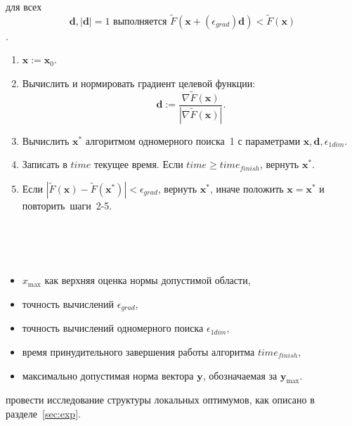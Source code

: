 для всех $$\textbf{d}, |\textbf{d}| = 1 \text{~выполняется~} \tilde{F}(\textbf{x} + (\epsilon_{grad})\textbf{d}) < \tilde{F}(\textbf{x})$$.\\
\begin{enumerate}
  \item $\textbf{x} := \textbf{x}_0.$
  \item Вычислить и нормировать градиент целевой функции:
   $$\textbf{d} := \frac{\nabla \tilde{F}(\textbf{x})}{|\nabla \tilde{F}(\textbf{x})|}.$$
  \item Вычислить $\textbf{x}^{*}$ алгоритмом одномерного поиска~1 с параметрами $\textbf{x}, \textbf{d}, \epsilon_{1dim}.$
  \item Записать в $time$ текущее время. Если $time \geq time_{finish}$, вернуть $\textbf{x}^{*}$.
  \item Если $|\tilde{F}(\textbf{x}) - \tilde{F}(\textbf{x}^{*})| < \epsilon_{grad}$, вернуть $\textbf{x}^{*}$, иначе положить $\textbf{x} = \textbf{x}^{*}$ и повторить~шаги~2-5.\\ \\
\end{enumerate}

\\ \\
\begin{itemize}
  \item $x_{\max}$ как верхняя оценка нормы допустимой области,
  \item точность вычислений $\epsilon_{grad}$,
  \item точность вычислений одномерного поиска $\epsilon_{1dim}$,
  \item время принудительного завершения работы алгоритма $time_{finish}$,
  \item максимально допустимая норма вектора ${\textbf{y}}$, обозначаемая за ${\textbf{y}}_{\max}$.\\
\end{itemize}

 провести исследование структуры локальных оптимумов, как описано в разделе~\ref{sec:exp}.\\

